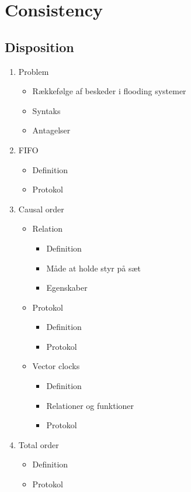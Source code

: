 \documentclass[a4, english]{article}
\begin{document}
\newpage

\section{Consistency}
\subsection{Disposition}
\begin{enumerate}
	\item Problem
  \begin{itemize}
  	\item Rækkefølge af beskeder i flooding systemer
    \item Syntaks
    \item Antagelser
  \end{itemize}
  \item FIFO
  \begin{itemize}
  	\item Definition
    \item Protokol
  \end{itemize}
  \item Causal order
  \begin{itemize}
  	\item Relation
    \begin{itemize}
    	\item Definition
      \item Måde at holde styr på sæt 
      \item Egenskaber
    \end{itemize}
    \item Protokol
    \begin{itemize}
    	\item Definition
      \item Protokol
    \end{itemize}
    \item Vector clocks
    \begin{itemize}
    	\item Definition 
      \item Relationer og funktioner
      \item Protokol
    \end{itemize}
  \end{itemize}
  \item Total order
  \begin{itemize}
  	\item Definition
    \item Protokol
  \end{itemize}
\end{enumerate}
\newpage
\end{document}
